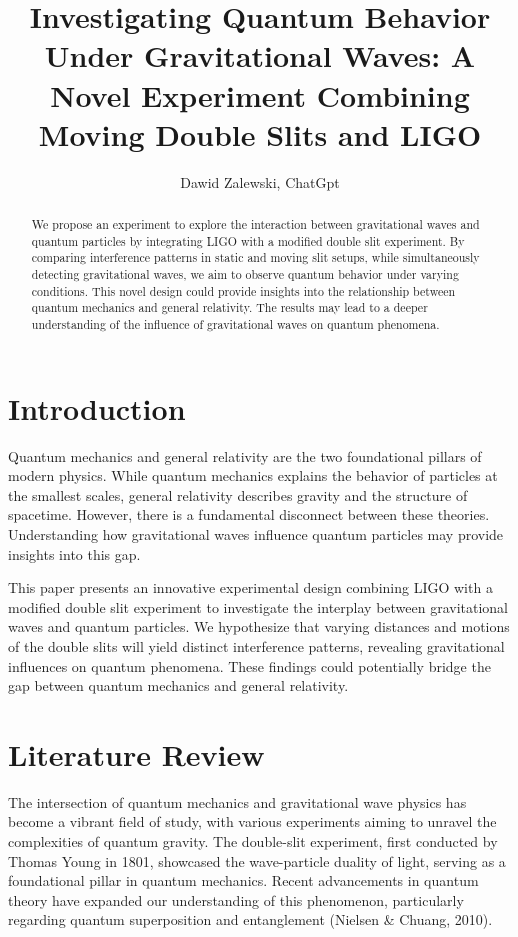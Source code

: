 \documentclass{article}
\title{Investigating Quantum Behavior Under Gravitational Waves: A Novel Experiment Combining Moving Double Slits and LIGO
}
\author{Dawid Zalewski, ChatGpt}
\begin{document}
\maketitle

\begin{abstract}
We propose an experiment to explore the interaction between gravitational waves and quantum particles by integrating LIGO with a modified double slit experiment. By comparing interference patterns in static and moving slit setups, while simultaneously detecting gravitational waves, we aim to observe quantum behavior under varying conditions. This novel design could provide insights into the relationship between quantum mechanics and general relativity. The results may lead to a deeper understanding of the influence of gravitational waves on quantum phenomena.
\end{abstract}

\section{Introduction}
Quantum mechanics and general relativity are the two foundational pillars of modern physics. While quantum mechanics explains the behavior of particles at the smallest scales, general relativity describes gravity and the structure of spacetime. However, there is a fundamental disconnect between these theories. Understanding how gravitational waves influence quantum particles may provide insights into this gap.

This paper presents an innovative experimental design combining LIGO with a modified double slit experiment to investigate the interplay between gravitational waves and quantum particles. We hypothesize that varying distances and motions of the double slits will yield distinct interference patterns, revealing gravitational influences on quantum phenomena. These findings could potentially bridge the gap between quantum mechanics and general relativity.

\section{Literature Review}
The intersection of quantum mechanics and gravitational wave physics has become a vibrant field of study, with various experiments aiming to unravel the complexities of quantum gravity. The double-slit experiment, first conducted by Thomas Young in 1801, showcased the wave-particle duality of light, serving as a foundational pillar in quantum mechanics. Recent advancements in quantum theory have expanded our understanding of this phenomenon, particularly regarding quantum superposition and entanglement (Nielsen \& Chuang, 2010).
\end{document}
